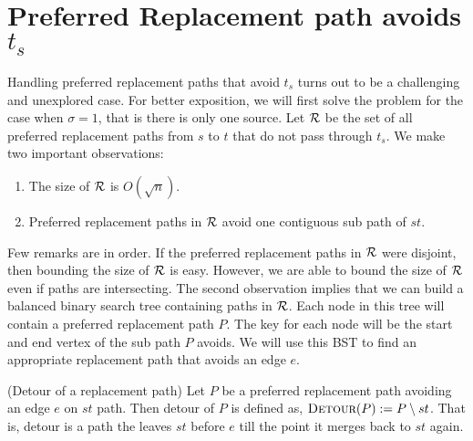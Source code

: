 \iflong
\else
\vspace{-2mm}
\fi
\section{Preferred Replacement path avoids $t_s$}

\label{sec:avoids}


Handling preferred replacement paths that avoid $t_s$ turns out to be a challenging and unexplored case. For better exposition, we will first solve the problem for the case when $\sigma=1$, that is there is only one source.
Let $\mathcal{R}$ be the set of all preferred replacement paths from $s$ to $t$ that do not pass through $t_s$. We make  two important observations:

\begin{enumerate}

\item The size of $\mathcal{R}$ is $ O(\sqrt n)$.

\item Preferred replacement paths in $\mathcal{R}$ avoid one contiguous sub path of $st$.

\end{enumerate}

\noindent Few remarks are in order. If the preferred replacement paths in $\mathcal{R}$ were disjoint, then bounding the size of $\mathcal{R}$ is easy. However, we are able to bound the size of $\mathcal{R}$ even if paths are intersecting.  The second observation implies that we can build a balanced binary search tree containing paths in $\mathcal{R}$. Each node in this tree will contain a preferred replacement path $P$. The key for each node will be the start and end vertex of the sub path $P$ avoids.  We will use this BST to find an appropriate replacement path that avoids an edge $e$.

\begin{definition}(Detour of a replacement path)
Let $P$ be a preferred replacement path avoiding an edge $e$ on $st$ path. Then detour of $P$ is defined as, $\textsc{Detour}(P) := P \setminus st$. That is, detour is a path the leaves $st$ before $e$ till the point it merges back to $st$ again.
\end{definition}

